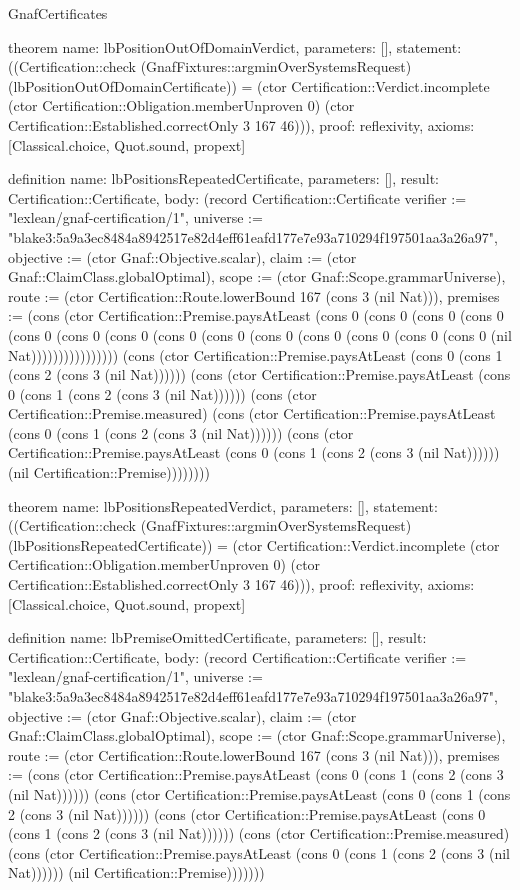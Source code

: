 \begin{lexlean}{GnafCertificates}
\begin{semanticmodule}
theorem{
  name: lbPositionOutOfDomainVerdict,
  parameters: [],
  statement: ((Certification::check (GnafFixtures::argminOverSystemsRequest) (lbPositionOutOfDomainCertificate)) = (ctor Certification::Verdict.incomplete (ctor Certification::Obligation.memberUnproven 0) (ctor Certification::Established.correctOnly 3 167 46))),
  proof: reflexivity{},
  axioms: [Classical.choice, Quot.sound, propext]
}

definition{
  name: lbPositionsRepeatedCertificate,
  parameters: [],
  result: Certification::Certificate,
  body: (record Certification::Certificate {verifier := "lexlean/gnaf-certification/1", universe := "blake3:5a9a3ec8484a8942517e82d4eff61eafd177e7e93a710294f197501aa3a26a97", objective := (ctor Gnaf::Objective.scalar), claim := (ctor Gnaf::ClaimClass.globalOptimal), scope := (ctor Gnaf::Scope.grammarUniverse), route := (ctor Certification::Route.lowerBound 167 (cons 3 (nil Nat))), premises := (cons (ctor Certification::Premise.paysAtLeast (cons 0 (cons 0 (cons 0 (cons 0 (cons 0 (cons 0 (cons 0 (cons 0 (cons 0 (cons 0 (cons 0 (cons 0 (cons 0 (cons 0 (nil Nat)))))))))))))))) (cons (ctor Certification::Premise.paysAtLeast (cons 0 (cons 1 (cons 2 (cons 3 (nil Nat)))))) (cons (ctor Certification::Premise.paysAtLeast (cons 0 (cons 1 (cons 2 (cons 3 (nil Nat)))))) (cons (ctor Certification::Premise.measured) (cons (ctor Certification::Premise.paysAtLeast (cons 0 (cons 1 (cons 2 (cons 3 (nil Nat)))))) (cons (ctor Certification::Premise.paysAtLeast (cons 0 (cons 1 (cons 2 (cons 3 (nil Nat)))))) (nil Certification::Premise)))))))})
}

theorem{
  name: lbPositionsRepeatedVerdict,
  parameters: [],
  statement: ((Certification::check (GnafFixtures::argminOverSystemsRequest) (lbPositionsRepeatedCertificate)) = (ctor Certification::Verdict.incomplete (ctor Certification::Obligation.memberUnproven 0) (ctor Certification::Established.correctOnly 3 167 46))),
  proof: reflexivity{},
  axioms: [Classical.choice, Quot.sound, propext]
}

definition{
  name: lbPremiseOmittedCertificate,
  parameters: [],
  result: Certification::Certificate,
  body: (record Certification::Certificate {verifier := "lexlean/gnaf-certification/1", universe := "blake3:5a9a3ec8484a8942517e82d4eff61eafd177e7e93a710294f197501aa3a26a97", objective := (ctor Gnaf::Objective.scalar), claim := (ctor Gnaf::ClaimClass.globalOptimal), scope := (ctor Gnaf::Scope.grammarUniverse), route := (ctor Certification::Route.lowerBound 167 (cons 3 (nil Nat))), premises := (cons (ctor Certification::Premise.paysAtLeast (cons 0 (cons 1 (cons 2 (cons 3 (nil Nat)))))) (cons (ctor Certification::Premise.paysAtLeast (cons 0 (cons 1 (cons 2 (cons 3 (nil Nat)))))) (cons (ctor Certification::Premise.paysAtLeast (cons 0 (cons 1 (cons 2 (cons 3 (nil Nat)))))) (cons (ctor Certification::Premise.measured) (cons (ctor Certification::Premise.paysAtLeast (cons 0 (cons 1 (cons 2 (cons 3 (nil Nat)))))) (nil Certification::Premise))))))})
}


\end{semanticmodule}
\end{lexlean}
